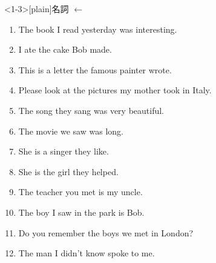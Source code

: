 \documentclass[aspectratio=169,xcolor={dvipsnames,table}]{beamer}
\begin{document}
\begin{frame}<1-3>[plain]{名詞 $\leftarrow$ }
 \begin{enumerate}
  \item The book  I read yesterday was interesting.
  \item I ate the cake  Bob made.
  \item This is a letter  the famous painter wrote.
  \item Please look at the pictures  my mother took in Italy.
  \item The song  they sang was very beautiful.
  \item The movie  we saw was long.
  \item She is a singer  they like.
  \item She is the girl  they helped.
  \item The teacher  you met is my uncle.
  \item The boy  I saw in the park is Bob.
  \item Do you remember the boys  we met in London?
  \item The man  I didn't know spoke to me.
 \end{enumerate}
\end{frame}
\end{document}
